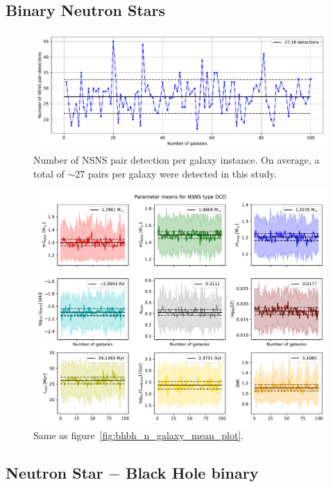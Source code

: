 \subsection{Binary Neutron Stars}
\begin{figure}[!h]
	\centering
	\includegraphics[width=\columnwidth]{analysis_data/main_analysis_folder/NSNS_n_detections}
	\caption{Number of NSNS pair detection per galaxy instance. On average, a total of $\sim$27 pairs per galaxy were detected in this study.}
	\label{fig:nsnsndetections}
\end{figure}

\begin{figure}[!h]
	\centering
	\includegraphics[width=\columnwidth]{analysis_data/main_analysis_folder/NSNS_n_galaxy_mean_plot}
	\caption{Same as figure~\ref{fig:bhbh_n_galaxy_mean_plot}.}
	\label{fig:nsns_n_galaxy_mean_plot}
\end{figure}

\subsection{Neutron Star $-$ Black Hole binary}

